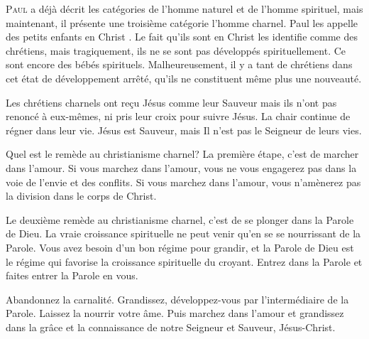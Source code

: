 
\lettrine{P}{aul} a déjà décrit les catégories de l'homme naturel
 et de l'homme spirituel, mais maintenant, il présente
 une troisième catégorie \ocadr l'homme charnel.
 Paul les appelle des \Og petits enfants en Christ \Fg{}.
 Le fait qu'ils sont \Og en Christ \Fg{} les identifie
 comme des chrétiens, mais tragiquement, ils ne se sont pas développés
 spirituellement. Ce sont encore des bébés spirituels.
 Malheureusement, il y a tant de chrétiens dans cet état
 de développement arrêté, qu'ils ne constituent même plus une nouveauté.

Les chrétiens charnels ont re\c{c}u Jésus comme leur Sauveur
 mais ils n'ont pas renoncé à eux-mêmes, ni pris leur croix pour suivre Jésus.
 La chair continue de régner dans leur vie.
 Jésus est Sauveur, mais Il n'est pas le Seigneur de leurs vies.


Quel est le remède au christianisme charnel?
 La première étape, c'est de marcher dans l'amour.
 Si vous marchez dans l'amour, vous ne vous engagerez pas
 dans la voie de l'envie et des conflits.
 Si vous marchez dans l'amour, vous n'amènerez pas
 la division dans le corps de Christ.

Le deuxième remède au christianisme charnel,
 c'est de se plonger dans la Parole de Dieu.
 La vraie croissance spirituelle ne peut venir qu'en se se nourrissant
 de la Parole. Vous avez besoin d'un bon régime pour grandir,
 et la Parole de Dieu est le régime qui favorise la croissance
 spirituelle du croyant.
 Entrez dans la Parole et faites entrer la Parole en vous.

Abandonnez la carnalité. Grandissez, développez-vous
 par l'intermédiaire de la Parole. Laissez la nourrir votre âme.
 Puis marchez dans l'amour et grandissez dans la
 grâce et la connaissance de notre Seigneur et Sauveur, Jésus-Christ.

\dvrule



